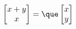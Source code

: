 \documentclass[preview]{standalone}
\begin{document}
\begin{align*}
\begin{bmatrix} x + y \\ x \end{bmatrix} = \que \begin{bmatrix} x \\ y \end{bmatrix}
\end{align*}
\end{document}
